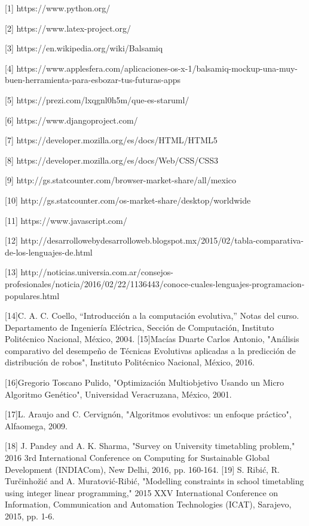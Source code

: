 \label{sec:bibliografia}

\begin{Titemize}
		\Titem \label{1}[1] https://www.python.org/ 
		
		\Titem \label{2}[2] https://www.latex-project.org/ 
		
		\Titem \label{3}[3] https://en.wikipedia.org/wiki/Balsamiq 
		
		\Titem \label{4}[4] https://www.applesfera.com/aplicaciones-os-x-1/balsamiq-mockup-una-muy-buen-herramienta-para-esbozar-tus-futuras-apps
		
		\Titem \label{5}[5] https://prezi.com/lxqgnl0h5m/que-es-staruml/
		
		\Titem \label{6}[6] https://www.djangoproject.com/
		
		\Titem \label{7}[7] https://developer.mozilla.org/es/docs/HTML/HTML5
		
		\Titem \label{8}[8] https://developer.mozilla.org/es/docs/Web/CSS/CSS3
		
		\Titem \label{9}[9] http://gs.statcounter.com/browser-market-share/all/mexico
		
		\Titem \label{10}[10] http://gs.statcounter.com/os-market-share/desktop/worldwide
		
		\Titem \label{11}[11] https://www.javascript.com/
		
		\Titem \label{12}[12] http://desarrollowebydesarrolloweb.blogspot.mx/2015/02/tabla-comparativa-de-los-lenguajes-de.html
		
		\Titem \label{13}[13] http://noticias.universia.com.ar/consejos-profesionales/noticia/2016/02/22/1136443/conoce-cuales-lenguajes-programacion-populares.html
		
		\Titem \label{14}[14]C. A. C. Coello, “Introducción a la computación evolutiva,” Notas del curso. Departamento de Ingeniería Eléctrica, Sección de Computación, Instituto Politécnico Nacional, México, 2004.
		\Titem \label{15}[15]Macías Duarte Carlos Antonio, "Análisis comparativo del desempeño de Técnicas Evolutivas aplicadas a la predicción de distribución de robos", Instituto Politécnico Nacional, México, 2016.
		
		\Titem \label{16}[16]Gregorio Toscano Pulido, "Optimización Multiobjetivo Usando un Micro Algoritmo Genético", Universidad Veracruzana, México, 2001.
		
		\Titem \label{17}[17]L. Araujo and C. Cervignón, "Algoritmos evolutivos: un enfoque práctico", Alfaomega, 2009.
		
		\Titem \label{18}[18] J. Pandey and A. K. Sharma, "Survey on University timetabling problem," 2016 3rd International Conference on Computing for Sustainable Global Development (INDIACom), New Delhi, 2016, pp. 160-164.
		\Titem \label{19}[19] S. Ribić, R. Turčinhožić and A. Muratović-Ribić, "Modelling constraints in school timetabling using integer linear programming," 2015 XXV International Conference on Information, Communication and Automation Technologies (ICAT), Sarajevo, 2015, pp. 1-6.
		

\end{Titemize}
